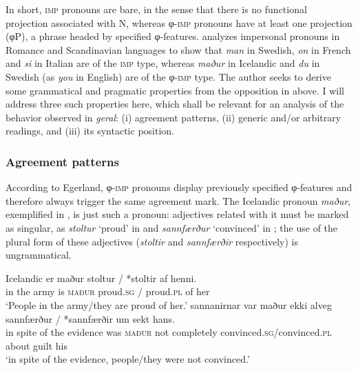 \documentclass[output=paper]{langscibook}
\begin{document}
In short, \textsc{imp} pronouns are bare, in the sense that there is no functional projection associated with N, whereas φ-\textsc{imp} pronouns have at least one projection (φP), a phrase headed by specified φ-fea\-tures. \citet{Egerland2003} analyzes impersonal pronouns in Romance and Scandinavian languages to show that {\textit{man} }{in Swedish,} {\textit{on} }{in French and} {\textit{si} }{in Italian are of the \textsc{imp} type, whereas} {\textit{maður} }{in Icelandic and} {\textit{du} }{in Swedish (as} {\textit{you} }{in English) are of the φ-\textsc{imp} type. The author seeks to derive some grammatical and pragmatic properties from the opposition in  above. I will address three such properties here, which shall be relevant for an analysis of the behavior observed in} {\textit{geral}}{: (i) agreement patterns, (ii) generic and/or arbitrary readings, and (iii) its syntactic position.}

\subsubsection{Agreement patterns}

According to Egerland, φ-\textsc{imp} pronouns display previously specified φ-fea\-tures and therefore always trigger the same agreement mark. The Icelandic pronoun {\textit{maður}}{, exemplified in , is just such a pronoun: adjectives related with it must be marked as singular, as} {\textit{stoltur} }{‘proud’ in  and} {\textit{sannfærður}} {‘convinced’ in ; the use of the plural form of these adjectives (}{\textit{stoltir}} {and} {\textit{sannfærðir} }{respectively) is ungrammatical.}

\ea\label{ex:avelar:7} Icelandic \citep[78]{Egerland2003}
 \ea\label{ex:avelar:7a}
       er  maður   stoltur {/} *stoltir   af henni.\\
         {in the army}   is \textsc{maður}   proud.\textsc{sg} /   proud.\textsc{pl}   of her\\
  \glt ‘People in the army/they are proud of her.’
 \ex\label{ex:avelar:7b} 
   sannanirnar   var   maður   ekki alveg {sannfærður / *sannfærðir}    {um sekt hans.}\\
         {in spite of} {the evidence}   was   \textsc{maður}   not completely {convinced.\textsc{sg}/convinced.\textsc{pl}} {about guilt his}\\
  \glt ‘in spite of the evidence, people/they were not convinced.’
\z
\z
\end{document}

